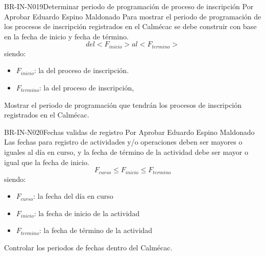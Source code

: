 \begin{BusinessRule}{BR-IN-N019}{Determinar periodo de programación de proceso de inscripción}
	{\bcIntegridad}    %
	{\btTimer}     %
	{\blInfluencing}    %
	\BRItem[Estado] Por Aprobar
	 Eduardo Espino Maldonado
	\BRItem[Descripción] Para mostrar el periodo de programación de los procesos de inscripción registrados en el Calmécac se debe construir con base en la fecha de inicio y fecha de término.
	\BRItem[Sentencia] $$del <F_{inicio}> al <F_{termino}>$$
		siendo:
		\begin{itemize}
			\item $F_{inicio}$: la  del proceso de inscripción.
			\item $F_{termino}$: la  del proceso de inscripción,
		\end{itemize}
	\BRItem[Motivación] Mostrar el periodo de programación que tendrán los procesos de inscripción registrados en el Calmécac.
\end{BusinessRule}

\begin{BusinessRule}{BR-IN-N020}{Fechas validas de registro}
	{\bcIntegridad}    %
	{\btTimer}     %
	{\blInfluencing}    %
	\BRItem[Estado] Por Aprobar
	 Eduardo Espino Maldonado
	\BRItem[Descripción] Las fechas para registro de actividades y/o operaciones deben ser mayores o iguales al día en curso, y la fecha de término de la actividad debe ser mayor o igual que la fecha de inicio.
	\BRItem[Sentencia] $$F_{curso} \leq F_{inicio} \leq F_{termino}$$
		siendo:
		\begin{itemize}
			\item $F_{curso}$: la fecha del día en curso
			\item $F_{inicio}$: la fecha de inicio de la actividad
			\item $F_{termino}$: la fecha de término de la actividad
		\end{itemize}
	\BRItem[Motivación] Controlar los periodos de fechas dentro del Calmécac.
\end{BusinessRule}

